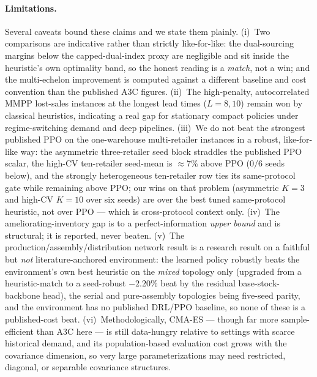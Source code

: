 \documentclass[11pt]{article}
\begin{document}
\paragraph{Limitations.}
Several caveats bound these claims and we state them plainly. (i)~Two comparisons are indicative rather
than strictly like-for-like: the dual-sourcing margins below the capped-dual-index proxy are negligible
and sit inside the heuristic's own optimality band, so the honest reading is a \emph{match}, not a win;
and the multi-echelon improvement is computed against a different baseline and cost convention than the
published A3C figures. (ii)~The high-penalty, autocorrelated MMPP lost-sales instances at the longest
lead times ($L=8,10$) remain won by classical heuristics, indicating a real gap for stationary compact
policies under regime-switching demand and deep pipelines. (iii)~We do not beat the strongest published
PPO on the one-warehouse multi-retailer instances in a robust, like-for-like way: the asymmetric
three-retailer seed block straddles the published PPO scalar, the high-CV ten-retailer seed-mean is
$\approx 7\%$ above PPO ($0/6$ seeds below), and the strongly heterogeneous ten-retailer row ties its
same-protocol gate while remaining above PPO; our wins on that problem (asymmetric $K{=}3$ and
high-CV $K{=}10$ over six seeds) are over the best tuned same-protocol heuristic, not over PPO ---
which is cross-protocol context only. (iv)~The
ameliorating-inventory gap is to a perfect-information \emph{upper bound} and is structural; it is
reported, never beaten. (v)~The production/assembly/distribution network result is a research result on
a faithful but \emph{not} literature-anchored environment: the learned policy robustly beats the
environment's own best heuristic on the \emph{mixed} topology only (upgraded from a heuristic-match to
a seed-robust $-2.20\%$ beat by the residual base-stock-backbone head), the serial and pure-assembly
topologies being five-seed parity, and the environment has
no published DRL/PPO baseline, so none of these is a published-cost beat. (vi)~Methodologically, CMA-ES --- though far more
sample-efficient than A3C here --- is still data-hungry relative to settings with scarce historical
demand, and its population-based evaluation cost grows with the covariance dimension, so very large
parameterizations may need restricted, diagonal, or separable covariance structures.
\end{document}
